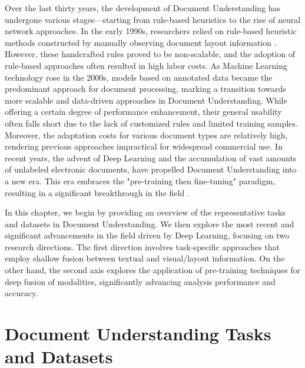 Over the last thirty years, the development of Document Understanding has undergone various stages—starting from rule-based heuristics to the rise of neural network approaches. In the early 1990s, researchers relied on rule-based heuristic methods constructed by manually observing document layout information \citep{wong1982document, fisher1990rule, lebourgeois1992fast}. However, these handcrafted rules proved to be non-scalable, and the adoption of rule-based approaches often resulted in high labor costs. As Machine Learning technology rose in the 2000s, models based on annotated data \citep{baechler2011multi, wei2013evaluation} became the predominant approach for document processing, marking a transition towards more scalable and data-driven approaches in Document Understanding. While offering a certain degree of performance enhancement, their general usability often falls short due to the lack of customized rules and limited training samples. Moreover, the adaptation costs for various document types are relatively high, rendering previous approaches impractical for widespread commercial use. In recent years, the advent of Deep Learning and the accumulation of vast amounts of unlabeled electronic documents, have propelled Document Understanding into a new era. This era embraces the "pre-training then fine-tuning" paradigm, resulting in a significant breakthrough in the field \citep{xu2020layoutlm, peng2022ernie}.

In this chapter, we begin by providing an overview of the representative tasks and datasets in Document Understanding. We then explore the most recent and significant advancements in the field driven by Deep Learning, focusing on two research directions. The first direction involves task-specific approaches that employ shallow fusion between textual and visual/layout information. On the other hand, the second axis explores the application of pre-training techniques for deep fusion of modalities, significantly advancing analysis performance and accuracy. 


\section{Document Understanding Tasks and Datasets}
\label{section:related-document-understanding-tasks-datasets}


